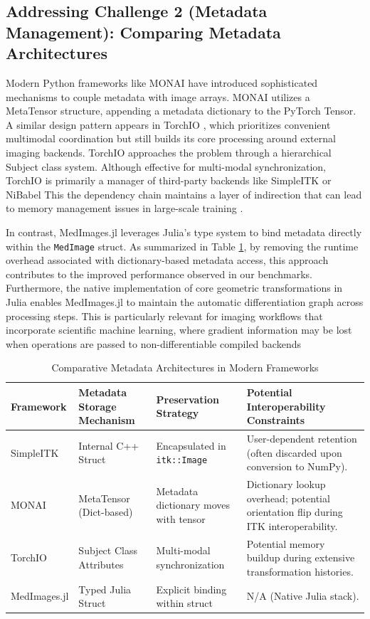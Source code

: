 \documentclass[10pt,letterpaper]{article}
\begin{document}
\subsection*{Addressing Challenge 2 (Metadata Management): Comparing Metadata Architectures}
Modern Python frameworks like MONAI \cite{CardosoLi2022} have introduced sophisticated mechanisms to couple metadata with image arrays. MONAI utilizes a MetaTensor structure, appending a metadata dictionary to the PyTorch Tensor. A similar design pattern appears in TorchIO \cite{perezgarcia2021torchio}, which prioritizes convenient multimodal coordination but still builds its core processing around external imaging backends. TorchIO approaches the problem through a hierarchical Subject class system. Although effective for multi-modal synchronization, TorchIO is primarily a manager of third-party backends  like SimpleITK or NiBabel \cite{perezgarcia2021torchio} This the dependency chain maintains a layer of indirection that can lead to memory management issues in large-scale training \cite{perezgarcia2021torchio}.

In contrast, MedImages.jl leverages Julia's type system to bind metadata directly within the \texttt{MedImage} struct. As summarized in Table \ref{tab:metadata_comparison}, by removing the runtime overhead associated with dictionary-based metadata access, this approach contributes to the improved performance observed in our benchmarks. Furthermore, the native implementation of core geometric transformations in Julia enables MedImages.jl to maintain the automatic differentiation graph across processing steps. This is particularly relevant for imaging workflows that incorporate scientific machine learning, where gradient information may be lost when operations are passed to non-differentiable compiled backends \cite{perezgarcia2021torchio} 

\begin{table}[H]
\centering
\caption{Comparative Metadata Architectures in Modern Frameworks}
\begin{tabular}{|p{2.5cm}|p{3.5cm}|p{3.5cm}|p{3.5cm}|}
\hline
\textbf{Framework} & \textbf{Metadata Storage Mechanism} & \textbf{Preservation Strategy} & \textbf{Potential Interoperability Constraints} \\
\hline
SimpleITK & Internal C++ Struct & Encapsulated in \texttt{itk::Image} & User-dependent retention (often discarded upon conversion to NumPy). \\
\hline
MONAI & MetaTensor (Dict-based) & Metadata dictionary moves with tensor & Dictionary lookup overhead; potential orientation flip during ITK interoperability. \\
\hline
TorchIO & Subject Class Attributes & Multi-modal synchronization & Potential memory buildup during extensive transformation histories. \\
\hline
MedImages.jl & Typed Julia Struct & Explicit binding within struct & N/A (Native Julia stack). \\
\hline
\end{tabular}
\label{tab:metadata_comparison}
\end{table}
\end{document}
